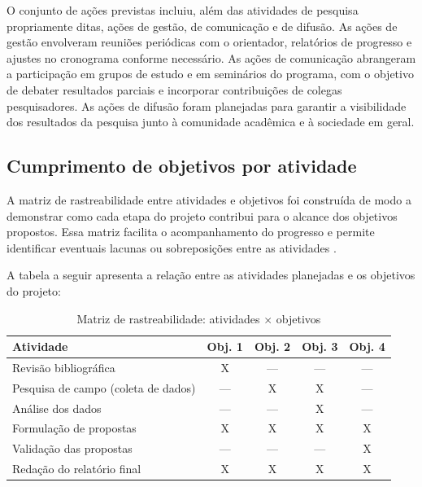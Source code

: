 O conjunto de ações previstas incluiu, além das atividades de pesquisa propriamente ditas, ações de gestão, de comunicação e de difusão. As ações de gestão envolveram reuniões periódicas com o orientador, relatórios de progresso e ajustes no cronograma conforme necessário. As ações de comunicação abrangeram a participação em grupos de estudo e em seminários do programa, com o objetivo de debater resultados parciais e incorporar contribuições de colegas pesquisadores. As ações de difusão foram planejadas para garantir a visibilidade dos resultados da pesquisa junto à comunidade acadêmica e à sociedade em geral.

\subsection{Cumprimento de objetivos por atividade}
\label{subsec:cumprimento_objetivos}

A matriz de rastreabilidade entre atividades e objetivos foi construída de modo a demonstrar como cada etapa do projeto contribui para o alcance dos objetivos propostos. Essa matriz facilita o acompanhamento do progresso e permite identificar eventuais lacunas ou sobreposições entre as atividades \cite{CRESWELL2018}.

A tabela a seguir apresenta a relação entre as atividades planejadas e os objetivos do projeto:

\begin{table}[htbp]
    \centering
    \caption{Matriz de rastreabilidade: atividades $\times$ objetivos}
    \label{tab:rastreabilidade}
    \begin{tabular}{|p{5cm}|c|c|c|c|}
        \hline
        \textbf{Atividade} & \textbf{Obj. 1} & \textbf{Obj. 2} & \textbf{Obj. 3} & \textbf{Obj. 4} \\
        \hline
        Revisão bibliográfica & X & --- & --- & --- \\
        \hline
        Pesquisa de campo (coleta de dados) & --- & X & X & --- \\
        \hline
        Análise dos dados & --- & --- & X & --- \\
        \hline
        Formulação de propostas & X & X & X & X \\
        \hline
        Validação das propostas & --- & --- & --- & X \\
        \hline
        Redação do relatório final & X & X & X & X \\
        \hline
    \end{tabular}
\end{table}

